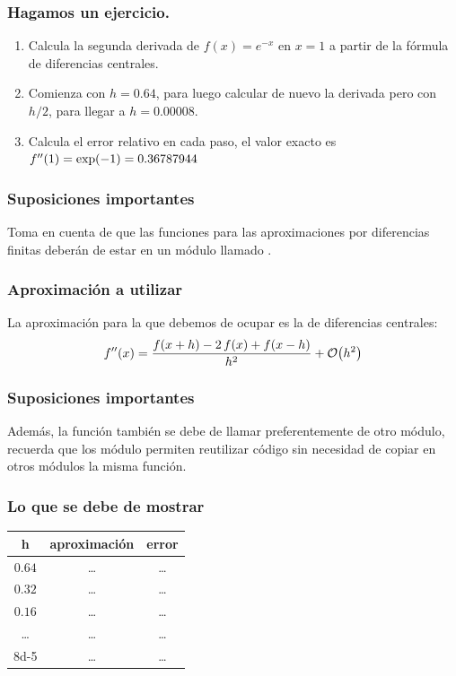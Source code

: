\documentclass[12pt]{beamer}
\begin{document}
\begin{frame}
\frametitle{Hagamos un ejercicio.}
\begin{enumerate}[<+->]
\item Calcula la segunda derivada de $f (x) = e^{-x}$ en $x = 1$ a partir de la fórmula de diferencias centrales.
\item Comienza con $h = 0.64$, para luego calcular de nuevo la derivada pero con $h /2$, para llegar a $h = 0.00008$.
\item Calcula el error relativo en cada paso, el valor exacto es ${f}^{\prime \prime} (1) = \exp(-1) = 0.36787944$
\end{enumerate}
\end{frame}
\begin{frame}
\frametitle{Suposiciones importantes}
Toma en cuenta de que las funciones para las aproximaciones por diferencias finitas deberán de estar en un módulo llamado .
\end{frame}
\begin{frame}
\frametitle{Aproximación a utilizar}
La aproximación para la  que debemos de ocupar es la de diferencias centrales:
\pause
\begin{align*}
\sderivada{f} (x) =  \dfrac{f(x + h) - 2 \, f (x) + f (x - h)}{h^{2}} + \order{h^{2}}
\end{align*}
\end{frame}
\begin{frame}
\frametitle{Suposiciones importantes}
Además, la función  también se debe de llamar preferentemente de otro módulo, recuerda que los módulo permiten reutilizar código sin necesidad de copiar en otros módulos la misma función.
\end{frame}
\begin{frame}
\frametitle{Lo que se debe de mostrar}
\begin{table}
\renewcommand{\arraystretch}{0.9}
\centering
\begin{tabular}{c | c | c}
h & aproximación & error \\ \hline
$0.64$ & \ldots & \ldots \\ \hline
$0.32$ & \ldots & \ldots \\ \hline
$0.16$ & \ldots & \ldots \\ \hline
\ldots & \ldots & \ldots \\ \hline
\num{8d-5} & \ldots & \ldots \\ \hline
\end{tabular}    
\end{table}
\end{frame}    
\end{document}
